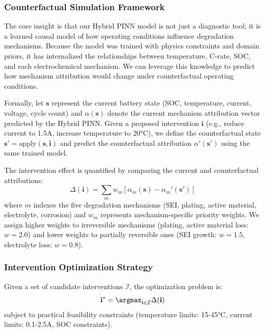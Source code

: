 \documentclass[5p,times,authoryear]{elsarticle}
\begin{document}
\subsubsection{Counterfactual Simulation Framework}

The core insight is that our Hybrid PINN model is not just a diagnostic tool; it is a learned causal model of how operating conditions influence degradation mechanisms. Because the model was trained with physics constraints and domain priors, it has internalized the relationships between temperature, C-rate, SOC, and each electrochemical mechanism. We can leverage this knowledge to predict how mechanism attribution would change under counterfactual operating conditions.

Formally, let $\mathbf{s}$ represent the current battery state (SOC, temperature, current, voltage, cycle count) and $\alpha(\mathbf{s})$ denote the current mechanism attribution vector predicted by the Hybrid PINN. Given a proposed intervention $\mathbf{i}$ (e.g., reduce current to 1.5A, increase temperature to 20°C), we define the counterfactual state $\mathbf{s}' = \text{apply}(\mathbf{s}, \mathbf{i})$ and predict the counterfactual attribution $\alpha'(\mathbf{s}')$ using the same trained model.

The intervention effect is quantified by comparing the current and counterfactual attributions:
\begin{equation}
\Delta(\mathbf{i}) = \sum_{m} w_m \left[ \alpha_m(\mathbf{s}) - \alpha_m'(\mathbf{s}') \right]
\end{equation}
where $m$ indexes the five degradation mechanisms (SEI, plating, active material, electrolyte, corrosion) and $w_m$ represents mechanism-specific priority weights. We assign higher weights to irreversible mechanisms (plating, active material loss: $w = 2.0$) and lower weights to partially reversible ones (SEI growth: $w = 1.5$, electrolyte loss: $w = 0.8$).

\subsubsection{Intervention Optimization Strategy}

Given a set of candidate interventions $\mathcal{I}$, the optimization problem is:
\begin{equation}
\mathbf{i}^* = \argmax_{\mathbf{i} \in \mathcal{I}} \Delta(\mathbf{i})
\end{equation}
subject to practical feasibility constraints (temperature limits: 15-45°C, current limits: 0.1-2.5A, SOC constraints).
\end{document}
